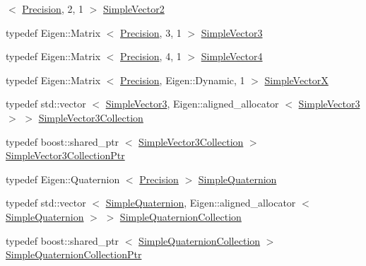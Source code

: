 \begin{DoxyCompactItemize}
$<$ \hyperlink{namespacenext__best__view_a471681a7c47e921eda8b6b1ba32b1786}{\-Precision}, 2, 1 $>$ \hyperlink{namespacenext__best__view_aeeab418972bc511118bde8d6d016af7f}{\-Simple\-Vector2}
\item 
typedef \-Eigen\-::\-Matrix\*
$<$ \hyperlink{namespacenext__best__view_a471681a7c47e921eda8b6b1ba32b1786}{\-Precision}, 3, 1 $>$ \hyperlink{namespacenext__best__view_a59fc75b908e198bc02a9b19ba88edf12}{\-Simple\-Vector3}
\item 
typedef \-Eigen\-::\-Matrix\*
$<$ \hyperlink{namespacenext__best__view_a471681a7c47e921eda8b6b1ba32b1786}{\-Precision}, 4, 1 $>$ \hyperlink{namespacenext__best__view_a209f68566d35160dd94fca758a33df33}{\-Simple\-Vector4}
\item 
typedef \-Eigen\-::\-Matrix\*
$<$ \hyperlink{namespacenext__best__view_a471681a7c47e921eda8b6b1ba32b1786}{\-Precision}, \-Eigen\-::\-Dynamic, 1 $>$ \hyperlink{namespacenext__best__view_a1b2e77aebfe02c317fdae78c64312df9}{\-Simple\-Vector\-X}
\item 
typedef std\-::vector\*
$<$ \hyperlink{namespacenext__best__view_a59fc75b908e198bc02a9b19ba88edf12}{\-Simple\-Vector3}, \*
\-Eigen\-::aligned\-\_\-allocator\*
$<$ \hyperlink{namespacenext__best__view_a59fc75b908e198bc02a9b19ba88edf12}{\-Simple\-Vector3} $>$ $>$ \hyperlink{namespacenext__best__view_a4a345e75760a974fd27b07c10dca3269}{\-Simple\-Vector3\-Collection}
\item 
typedef boost\-::shared\-\_\-ptr\*
$<$ \hyperlink{namespacenext__best__view_a4a345e75760a974fd27b07c10dca3269}{\-Simple\-Vector3\-Collection} $>$ \hyperlink{namespacenext__best__view_ad0c836f196d199ad5f3b89c2eb24e96e}{\-Simple\-Vector3\-Collection\-Ptr}
\item 
typedef \-Eigen\-::\-Quaternion\*
$<$ \hyperlink{namespacenext__best__view_a471681a7c47e921eda8b6b1ba32b1786}{\-Precision} $>$ \hyperlink{namespacenext__best__view_a165f1f159539ff8e583fb7fe3620390c}{\-Simple\-Quaternion}
\item 
typedef std\-::vector\*
$<$ \hyperlink{namespacenext__best__view_a165f1f159539ff8e583fb7fe3620390c}{\-Simple\-Quaternion}, \*
\-Eigen\-::aligned\-\_\-allocator\*
$<$ \hyperlink{namespacenext__best__view_a165f1f159539ff8e583fb7fe3620390c}{\-Simple\-Quaternion} $>$ $>$ \hyperlink{namespacenext__best__view_a841975b577c4a40b2acabb87fd735488}{\-Simple\-Quaternion\-Collection}
\item 
typedef boost\-::shared\-\_\-ptr\*
$<$ \hyperlink{namespacenext__best__view_a841975b577c4a40b2acabb87fd735488}{\-Simple\-Quaternion\-Collection} $>$ \hyperlink{namespacenext__best__view_a56eab77c28120ee9265ea6fa82a4a3c5}{\-Simple\-Quaternion\-Collection\-Ptr}

\end{DoxyCompactItemize}
